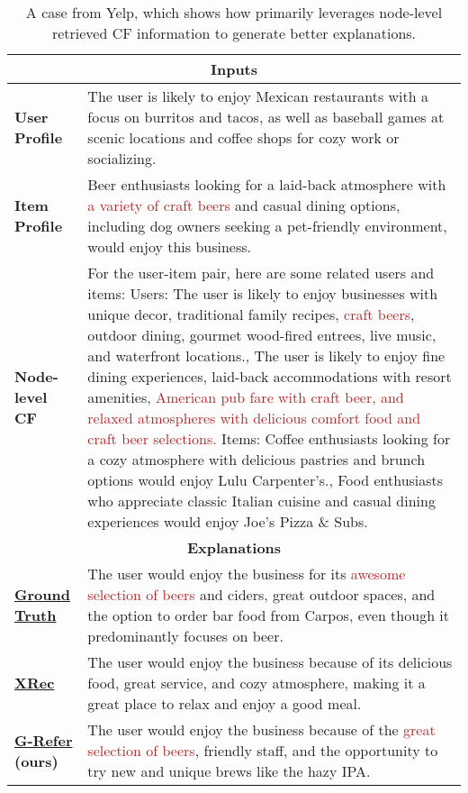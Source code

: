 \begin{table*}[t]
    \centering
    \caption{A case from Yelp, which shows how \model primarily leverages node-level retrieved CF information to generate better explanations.}
    \small
    \begin{tabular}{p{}p{}}
        \toprule
        \multicolumn{2}{c}{\textbf{Inputs}} \\ \midrule
        \textbf{User Profile} &  The user is likely to enjoy Mexican restaurants with a focus on burritos and tacos, as well as baseball games at scenic locations and coffee shops for cozy work or socializing. \\
        \midrule
        \textbf{Item Profile} & Beer enthusiasts looking for a laid-back atmosphere with \textcolor[HTML]{B22222}{a variety of craft beers} and casual dining options, including dog owners seeking a pet-friendly environment, would enjoy this business.
        \\
        \midrule  
        \textbf{Node-level CF} & For the user-item pair, here are some related users and items: Users: The user is likely to enjoy businesses with unique decor, traditional family recipes, \textcolor[HTML]{B22222}{craft beers}, outdoor dining, gourmet wood-fired entrees, live music, and waterfront locations., The user is likely to enjoy fine dining experiences, laid-back accommodations with resort amenities, \textcolor[HTML]{B22222}{American pub fare with craft beer, and relaxed atmospheres with delicious comfort food and craft beer selections.} Items: Coffee enthusiasts looking for a cozy atmosphere with delicious pastries and brunch options would enjoy Lulu Carpenter's., Food enthusiasts who appreciate classic Italian cuisine and casual dining experiences would enjoy Joe's Pizza \& Subs. \\ \midrule
        \multicolumn{2}{c}{\textbf{Explanations}} 
         \\ \midrule 
        \textbf{\underline{Ground Truth}} & The user would enjoy the business for its \textcolor[HTML]{B22222}{awesome selection of beers} and ciders, great outdoor spaces, and the option to order bar food from Carpos, even though it predominantly focuses on beer.
         \\ \midrule
        \textbf{\underline{XRec}} & The user would enjoy the business because of its delicious food, great service, and cozy atmosphere, making it a great place to relax and enjoy a good meal. \\ \midrule
         \textbf{\underline{G-Refer} (ours)} & The user would enjoy the business because of the \textcolor[HTML]{B22222}{great selection of beers}, friendly staff, and the opportunity to try new and unique brews like the hazy IPA. \\ 
        \bottomrule
    \end{tabular}
    \label{tab:case1}
\end{table*}


